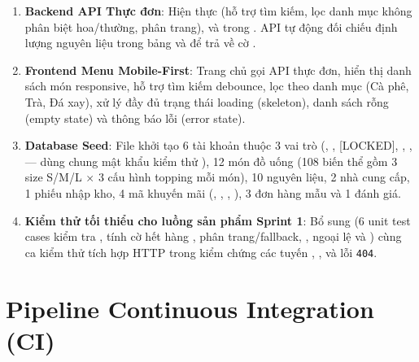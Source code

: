 \documentclass[12pt,a4paper]{report}
\begin{document}
\begin{enumerate}[leftmargin=*]
\item \textbf{Backend API Thực đơn}: Hiện thực  (hỗ trợ tìm kiếm, lọc danh mục không phân biệt hoa/thường, phân trang),  và  trong . API tự động đối chiếu định lượng nguyên liệu trong bảng  và  để trả về cờ .
\item \textbf{Frontend Menu Mobile-First}: Trang chủ  gọi API thực đơn, hiển thị danh sách món responsive, hỗ trợ tìm kiếm debounce, lọc theo danh mục (Cà phê, Trà, Đá xay), xử lý đầy đủ trạng thái loading (skeleton), danh sách rỗng (empty state) và thông báo lỗi (error state).
\item \textbf{Database Seed}: File  khởi tạo 6 tài khoản thuộc 3 vai trò (, ,  [LOCKED], , ,  --- dùng chung mật khẩu kiểm thử ), 12 món đồ uống (108 biến thể gồm 3 size S/M/L $\times$ 3 cấu hình topping mỗi món), 10 nguyên liệu, 2 nhà cung cấp, 1 phiếu nhập kho, 4 mã khuyến mãi (, , , ), 3 đơn hàng mẫu và 1 đánh giá.
\item \textbf{Kiểm thử tối thiểu cho luồng sản phẩm Sprint 1}: Bổ sung  (6 unit test cases kiểm tra , tính cờ hết hàng , phân trang/fallback, , ngoại lệ  và ) cùng ca kiểm thử tích hợp HTTP  trong  kiểm chứng các tuyến , ,  và lỗi \texttt{404}.
\end{enumerate}

\section{Pipeline Continuous Integration (CI)}
\end{document}
